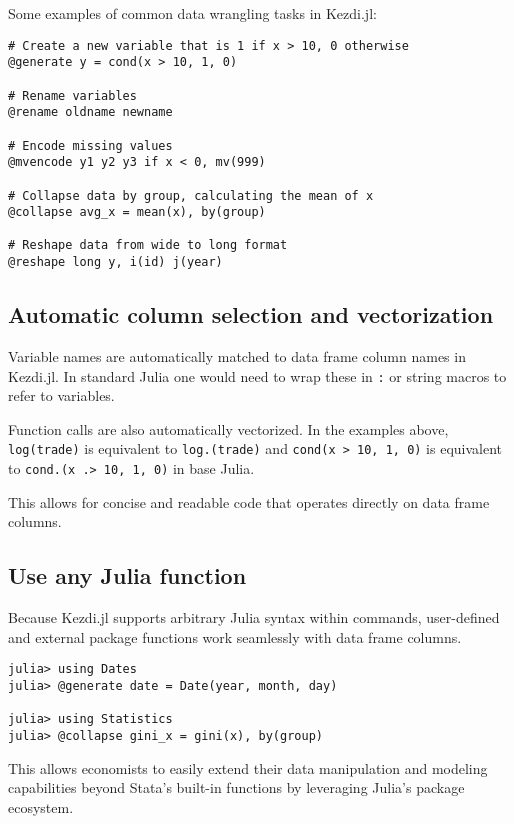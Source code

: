 \documentclass{juliacon}
\begin{document}
Some examples of common data wrangling tasks in Kezdi.jl:

\begin{verbatim}
# Create a new variable that is 1 if x > 10, 0 otherwise
@generate y = cond(x > 10, 1, 0)

# Rename variables
@rename oldname newname

# Encode missing values
@mvencode y1 y2 y3 if x < 0, mv(999)

# Collapse data by group, calculating the mean of x
@collapse avg_x = mean(x), by(group)

# Reshape data from wide to long format
@reshape long y, i(id) j(year)
\end{verbatim}

\subsection{Automatic column selection and vectorization}

Variable names are automatically matched to data frame column names in Kezdi.jl. In standard Julia one would need to wrap these in \texttt{:} or string macros to refer to variables.

Function calls are also automatically vectorized. In the examples above, \texttt{log(trade)} is equivalent to \texttt{log.(trade)} and \texttt{cond(x > 10, 1, 0)} is equivalent to \texttt{cond.(x .> 10, 1, 0)} in base Julia.

This allows for concise and readable code that operates directly on data frame columns.

\subsection{Use any Julia function}

Because Kezdi.jl supports arbitrary Julia syntax within commands, user-defined and external package functions work seamlessly with data frame columns.

\begin{verbatim}
julia> using Dates
julia> @generate date = Date(year, month, day)

julia> using Statistics
julia> @collapse gini_x = gini(x), by(group) 
\end{verbatim}

This allows economists to easily extend their data manipulation and modeling capabilities beyond Stata's built-in functions by leveraging Julia's package ecosystem. 
\end{document}
